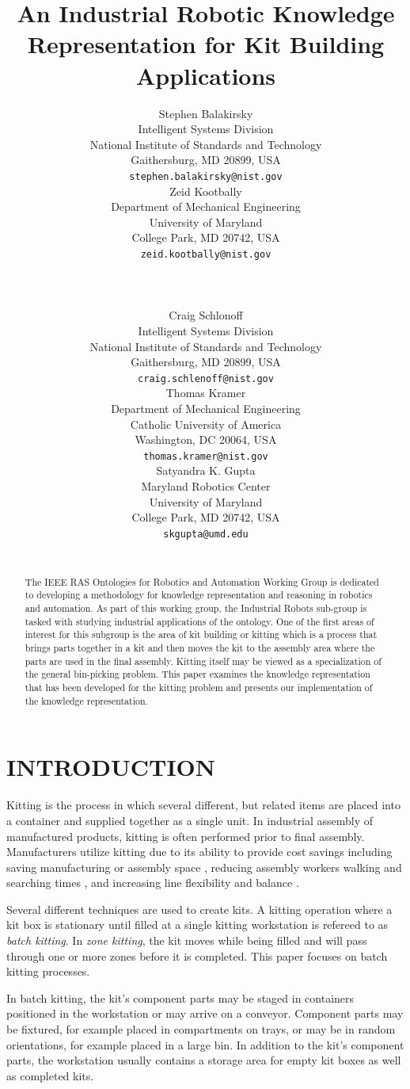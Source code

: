 \documentclass[a4paper, 10pt, conference]{ieeeconf}      %
\title{\LARGE \bf
An  Industrial Robotic Knowledge Representation for Kit Building Applications
}
\author{ \parbox{3 in}{\centering Stephen Balakirsky\\
         Intelligent Systems Division\\
         National Institute of Standards and Technology\\
        Gaithersburg, MD 20899, USA\\
         {\tt\small stephen.balakirsky@nist.gov}}
         \hspace*{ 0.5 in}
         \parbox{3 in}{ \centering Zeid Kootbally\\
          Department of Mechanical Engineering \\
         University of Maryland\\
         College Park, MD 20742, USA\\
         {\tt\small zeid.kootbally@nist.gov}}\\ \\
	\parbox{2.25 in}{\centering Craig Schlonoff\\
         Intelligent Systems Division\\
         National Institute of Standards and Technology\\
        Gaithersburg, MD 20899, USA\\
         {\tt\small craig.schlenoff@nist.gov}}
        \hspace*{0.05in}
         \parbox{2.25 in}{ \centering Thomas Kramer\\
          Department of Mechanical Engineering \\
         Catholic University of America\\
         Washington, DC 20064, USA\\
         {\tt\small thomas.kramer@nist.gov}}
        \hspace*{0.05in}
         \parbox{2.25 in}{ \centering Satyandra K. Gupta\\
          Maryland Robotics Center\\
         University of Maryland\\
         College Park, MD 20742, USA\\
         {\tt\small skgupta@umd.edu}}\\
}
\begin{document}
\maketitle
\thispagestyle{empty}
\pagestyle{empty}


\begin{abstract}

The IEEE RAS Ontologies for Robotics and Automation Working Group is dedicated to developing a methodology for knowledge representation and reasoning in robotics and automation. As part of this working group, the Industrial Robots sub-group is tasked with studying industrial applications of the ontology. One of the first areas of interest for this subgroup is the area of kit building or kitting which is a process that brings parts together in a kit and then moves the kit to the assembly area where the parts are used in the final assembly. Kitting itself may be viewed as a specialization of the general bin-picking problem. This paper examines the knowledge representation that has been developed for the kitting problem and presents our implementation of the knowledge representation.

\end{abstract}


\section{INTRODUCTION}
Kitting is the process in which several different, but related items are placed into a container and supplied together as a single unit.
In industrial assembly of manufactured products, kitting is often performed prior to final assembly. Manufacturers utilize kitting
due to its ability to provide cost savings \cite{Carlsson_2008} including saving manufacturing or assembly space \cite{Medbo2003}, reducing assembly workers walking and searching times \cite{Schwind1992}, and increasing line flexibility \cite{Bozer1992} and balance \cite{Jiao2000}.

Several different techniques are used to create kits. A kitting operation where a kit box is stationary until filled at a single
kitting workstation is refereed to as {\it batch kitting}. In {\it zone kitting}, the kit moves while being filled and will pass through one or
more zones before it is completed. This paper focuses on batch kitting processes.

In batch kitting, the kit's component parts may be staged in containers positioned in the workstation or may arrive on a conveyor.
Component parts may be fixtured, for example placed in compartments on trays, or may be in random orientations, for example
placed in a large bin. In addition to the kit's component parts, the workstation usually contains a storage area for empty kit boxes as
well as completed kits.
\end{document}
